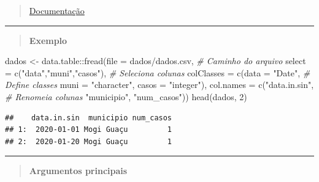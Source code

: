 \documentclass[
]{book}
\newenvironment{Shaded}{\begin{snugshade}}{\end{snugshade}}
\newcommand{\AttributeTok}[1]{\textcolor[rgb]{0.77,0.63,0.00}{#1}}
\newcommand{\CommentTok}[1]{\textcolor[rgb]{0.56,0.35,0.01}{\textit{#1}}}
\newcommand{\DecValTok}[1]{\textcolor[rgb]{0.00,0.00,0.81}{#1}}
\newcommand{\FunctionTok}[1]{\textcolor[rgb]{0.00,0.00,0.00}{#1}}
\newcommand{\NormalTok}[1]{#1}
\newcommand{\OtherTok}[1]{\textcolor[rgb]{0.56,0.35,0.01}{#1}}
\newcommand{\SpecialCharTok}[1]{\textcolor[rgb]{0.00,0.00,0.00}{#1}}
\newcommand{\StringTok}[1]{\textcolor[rgb]{0.31,0.60,0.02}{#1}}
\theoremstyle{definition}
\theoremstyle{definition}
\theoremstyle{definition}
\theoremstyle{definition}
\theoremstyle{remark}
\begin{document}
\begin{quote}
\href{https://www.rdocumentation.org/packages/data.table/versions/1.14.2/topics/fread}{Documentação}
\end{quote}

\begin{center}\rule{0.5\linewidth}{0.5pt}\end{center}

\begin{quote}
\textbf{Exemplo}
\end{quote}

\begin{Shaded}
\begin{Highlighting}[]
\NormalTok{dados }\OtherTok{\textless{}{-}}\NormalTok{ data.table}\SpecialCharTok{::}\FunctionTok{fread}\NormalTok{(}\AttributeTok{file =} \StringTok{\textquotesingle{}dados/dados.csv\textquotesingle{}}\NormalTok{,            }\CommentTok{\# Caminho do arquivo}
                           \AttributeTok{select =} \FunctionTok{c}\NormalTok{(}\StringTok{"data"}\NormalTok{,}\StringTok{"muni"}\NormalTok{,}\StringTok{"casos"}\NormalTok{),   }\CommentTok{\# Seleciona colunas}
                           \AttributeTok{colClasses =} \FunctionTok{c}\NormalTok{(}\AttributeTok{data =} \StringTok{"Date"}\NormalTok{,        }\CommentTok{\# Define classes}
                                          \AttributeTok{muni =} \StringTok{"character"}\NormalTok{,}
                                          \AttributeTok{casos =} \StringTok{"integer"}\NormalTok{),}
                           \AttributeTok{col.names =} \FunctionTok{c}\NormalTok{(}\StringTok{"data.in.sin"}\NormalTok{,         }\CommentTok{\# Renomeia colunas}
                                         \StringTok{"municipio"}\NormalTok{, }
                                         \StringTok{"num\_casos"}\NormalTok{)) }
\FunctionTok{head}\NormalTok{(dados, }\DecValTok{2}\NormalTok{)}
\end{Highlighting}
\end{Shaded}

\begin{verbatim}
##    data.in.sin  municipio num_casos
## 1:  2020-01-01 Mogi Guaçu         1
## 2:  2020-01-20 Mogi Guaçu         1
\end{verbatim}

\begin{center}\rule{0.5\linewidth}{0.5pt}\end{center}

\begin{quote}
\textbf{Argumentos principais}
\end{quote}
\end{document}
